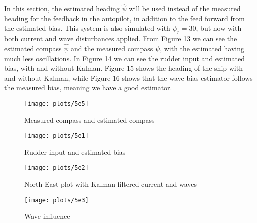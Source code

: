 In this section, the estimated heading $\hat \psi $ will be used instead of the measured heading for the feedback in the autopilot, in addition to the feed forward from the estimated bias. This system is also simulated with ${\psi _r} = 30$, but now with both current and wave disturbances applied.
From Figure 13 we can see the estimated compass $\hat{\psi}$ and the measured compass $\psi$, with the estimated having much less oscillations. In Figure 14 we can see the rudder input and estimated bias, with and without Kalman. Figure 15 shows the heading of the ship with and without Kalman, while Figure 16 shows that the wave bias estimator follows the measured bias, meaning we have a good estimator. 

\begin{figure}[!htb]
    \caption{Measured compass and estimated compass}
    \centering
    \centerline{\texttt{[image: plots/5e5]}}
    \label{plot:5e1}
\end{figure}


\begin{figure}[!htb]
    \caption{Rudder input and estimated bias}
    \centering
    \centerline{\texttt{[image: plots/5e1]}}
    \label{plot:5e1}
\end{figure}

\begin{figure}[!htb]
    \caption{North-East plot with Kalman filtered current and waves}
    \centering
    \centerline{\texttt{[image: plots/5e2]}}
    \label{plot:5e2}
\end{figure}

\begin{figure}[!htb]
    \caption{Wave influence}
    \centering
    \centerline{\texttt{[image: plots/5e3]}}
    \label{plot:5e3}
\end{figure}

\newpage\null\thispagestyle{empty}\newpage